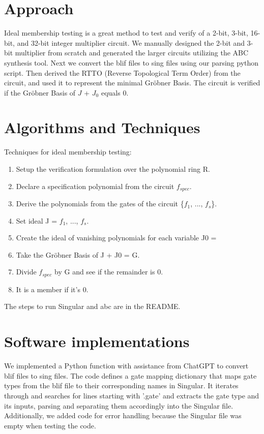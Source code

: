 \documentclass[conference]{IEEEtran}
\begin{document}
\section{Approach}
Ideal membership testing is a great method to test and verify of a 2-bit, 3-bit, 16-bit, and 32-bit integer multiplier circuit.
We manually designed the 2-bit and 3-bit multiplier from scratch and generated the larger circuits utilizing the ABC synthesis tool. Next we
convert the blif files to sing files using our parsing python script. Then derived the RTTO (Reverse Topological Term Order) from the circuit, and used it to
represent the minimal Gröbner Basis. The circuit is verified if the Gröbner Basis of $J$ + $J_{0}$ equals 0.

\section{Algorithms and Techniques}
Techniques for ideal membership testing: 
\begin{enumerate}
    \item Setup the verification formulation over the polynomial ring R. 
    \item Declare a specification polynomial from the circuit $f_{spec}$.
    \item Derive the polynomials from the gates of the circuit \{$f_{1}$, ..., $f_{s}$\}. 
    \item Set ideal J = $f_{1}$, ..., $f_{s}$. 
    \item Create the ideal of vanishing polynomials for each variable J0 = 
    \item Take the Gröbner Basis of J + J0 = G.  
    \item Divide $f_{spec}$ by G and see if the remainder is 0. 
    \item It is a member if it's 0. 
\end{enumerate}
The steps to run Singular and abc are in the README. 

\section{Software implementations}
We implemented a Python function with assistance from ChatGPT to convert blif files to sing files. The code defines a gate mapping dictionary that maps gate types 
from the blif file to their corresponding names in Singular. It iterates through and searches for lines starting with '.gate' and extracts the gate type and its 
inputs, parsing and separating them accordingly into the Singular file. Additionally, we added code for error handling because the Singular file was empty when 
testing the code.   
\end{document}
